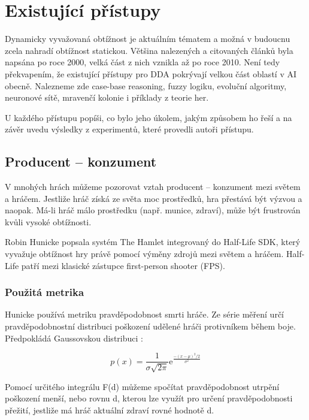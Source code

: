 \chapter{Existující přístupy}

Dynamicky vyvažovaná obtížnost je aktuálním tématem a možná v budoucnu zcela nahradí obtížnost statickou. Většina nalezených a citovaných článků byla napsána po roce 2000, velká část z nich vznikla až po roce 2010. Není tedy překvapením, že existující přístupy pro DDA pokrývají velkou část oblastí v AI obecně. Nalezneme zde case-base reasoning, fuzzy logiku, evoluční algoritmy, neuronové sítě, mravenčí kolonie i příklady z teorie her.

U každého přístupu popíši, co bylo jeho úkolem, jakým způsobem ho řeší a na závěr uvedu výsledky z experimentů, které provedli autoři přístupu.

\section{Producent – konzument}

V mnohých hrách můžeme pozorovat vztah producent – konzument mezi světem a hráčem. Jestliže hráč získá ze světa moc prostředků, hra přestává být výzvou a naopak. Má-li hráč málo prostředku (např. munice, zdraví), může být frustrován kvůli vysoké obtížnosti.

Robin Hunicke popsala systém The Hamlet\cite{20Hun} integrovaný do Half-Life SDK\cite{hlsdk}, který vyvažuje obtížnost hry právě pomocí výměny zdrojů mezi světem a hráčem. Half-Life patří mezi klasické zástupce first-person shooter (FPS).

\subsection{Použitá metrika}

Hunicke používá metriku pravděpodobnost smrti hráče. Ze série měření určí pravděpodobnostní distribuci poškození udělené hráči protivníkem během boje. Předpokládá Gaussovskou distribuci :

\begin{equation}
	   p(x)=\frac{1}{\sigma\sqrt{2\pi}}\mathrm{e}^{\frac{-(x-\mu)^2/2}{\sigma^2}}
\end{equation}

Pomocí určitého integrálu F(d) můžeme spočítat pravděpodobnost utrpění poškození menší, nebo rovnu d, kterou lze využít pro určení pravděpodobnosti přežití, jestliže má hráč aktuální zdraví rovné hodnotě d.

